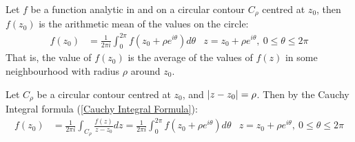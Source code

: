 \documentclass[12pt, english]{book}
\makeatletter
\renewenvironment{proof}[1][\proofname]{\par
	\pushQED{\qed}%
	\normalfont \topsep6\p@\@plus6\p@\relax
	\list{}{%
		\settowidth{\leftmargin}{\itshape\proofname:\hskip\labelsep}%
		\setlength{\labelwidth}{0pt}%
		\setlength{\itemindent}{-\leftmargin}%
	}%
	\item[\hskip\labelsep\itshape#1\@addpunct{:}]\ignorespaces
	}{ \popQED\endlist\@endpefalse}
\makeatother
\begin{document}
	\begin{theorem}
		\label{Gauss's Mean Value Theorem - Complex}
		Let \(f\) be a function analytic in and on a circular contour \(C_\rho\) centred at \(z_0\), then \(f(z_0)\) is the arithmetic mean of the values on the circle:
		\begin{align*}
			f(z_0) &= \frac{1}{2\pi i} \int_{0}^{2\pi} f(z_0 + \rho e^{i\theta}) d\theta 
			& z=z_0 + \rho e^{i\theta}, \ 0\leq \theta \leq 2\pi
		\end{align*}
		That is, the value of \(f(z_0)\) is the average of the values of \(f(z)\) in some neighbourhood with radius \(\rho\) around \(z_0\).
	\end{theorem}
	\begin{proof}
		Let \(C_\rho\) be a circular contour centred at \(z_0\), and \(\abs{z-z_0} = \rho\). Then by the Cauchy Integral formula (\cref{Cauchy Integral Formula}):
		\begin{align*}
			f(z_0) &= \frac{1}{2\pi i} \int_{C_\rho} \frac{f(z)}{z-z_0} dz = \frac{1}{2\pi i} \int_{0}^{2\pi} f(z_0 + \rho e^{i\theta}) d\theta 
			& z=z_0 + \rho e^{i\theta}, \ 0\leq \theta \leq 2\pi
		\end{align*}
	\end{proof}
	
\end{document}
